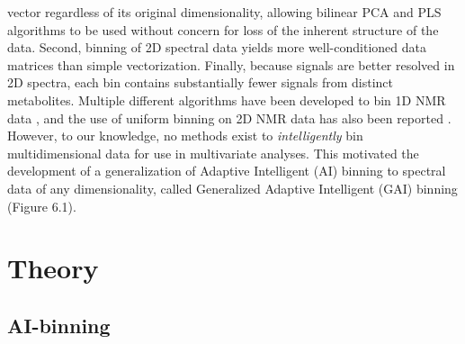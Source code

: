 \begin{doublespace}
vector regardless of its original dimensionality, allowing bilinear PCA and
PLS algorithms to be used without concern for loss of the inherent structure
of the data. Second, binning of 2D spectral data yields more well-conditioned
data matrices than simple vectorization. Finally, because signals are better
resolved in 2D spectra, each bin contains substantially fewer signals from
distinct metabolites. Multiple different algorithms have been developed to
bin 1D NMR data \cite{
  anderson:metab2008,
  anderson:metab2011,
  davis:cils2007,
  demeyer:anchem2008,
  sousa:cils2013}, and the use of uniform binning on 2D NMR data has also been
reported \cite{van:jpr2008}. However, to our knowledge, no methods
exist to {\it intelligently} bin multidimensional data for use in multivariate
analyses. This motivated the development of a generalization of Adaptive
Intelligent (AI) binning \cite{demeyer:anchem2008} to spectral data
of any dimensionality, called Generalized Adaptive Intelligent (GAI) binning
(Figure 6.1).
\end{doublespace}

\section{Theory}

\subsection{AI-binning}

